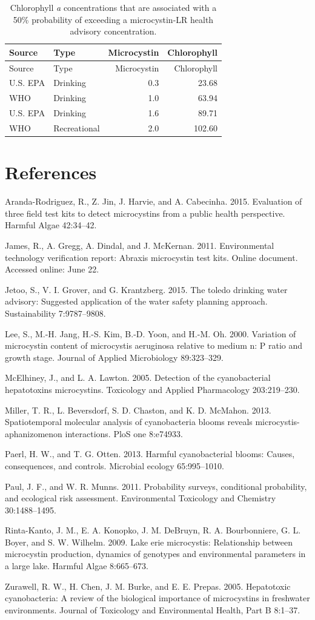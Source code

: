 \documentclass[11pt,]{article}
\begin{document}
\newpage

\begin{longtable}[c]{@{}llrr@{}}
\caption{Chlorophyll \textit{a} concentrations that are associated with
a 50\% probability of exceeding a microcystin-LR health advisory
concentration. \label{tab:mc_chla_table}}\tabularnewline
\toprule
Source & Type & Microcystin & Chlorophyll\tabularnewline
\midrule
\endfirsthead
\toprule
Source & Type & Microcystin & Chlorophyll\tabularnewline
\midrule
\endhead
U.S. EPA & Drinking & 0.3 & 23.68\tabularnewline
WHO & Drinking & 1.0 & 63.94\tabularnewline
U.S. EPA & Drinking & 1.6 & 89.71\tabularnewline
WHO & Recreational & 2.0 & 102.60\tabularnewline
\bottomrule
\end{longtable}

\newpage

\section*{References}\label{references}

Aranda-Rodriguez, R., Z. Jin, J. Harvie, and A. Cabecinha. 2015.
Evaluation of three field test kits to detect microcystins from a public
health perspective. Harmful Algae 42:34--42.

James, R., A. Gregg, A. Dindal, and J. McKernan. 2011. Environmental
technology verification report: Abraxis microcystin test kits. Online
document. Accessed online: June 22.

Jetoo, S., V. I. Grover, and G. Krantzberg. 2015. The toledo drinking
water advisory: Suggested application of the water safety planning
approach. Sustainability 7:9787--9808.

Lee, S., M.-H. Jang, H.-S. Kim, B.-D. Yoon, and H.-M. Oh. 2000.
Variation of microcystin content of microcystis aeruginosa relative to
medium n: P ratio and growth stage. Journal of Applied Microbiology
89:323--329.

McElhiney, J., and L. A. Lawton. 2005. Detection of the cyanobacterial
hepatotoxins microcystins. Toxicology and Applied Pharmacology
203:219--230.

Miller, T. R., L. Beversdorf, S. D. Chaston, and K. D. McMahon. 2013.
Spatiotemporal molecular analysis of cyanobacteria blooms reveals
microcystis-aphanizomenon interactions. PloS one 8:e74933.

Paerl, H. W., and T. G. Otten. 2013. Harmful cyanobacterial blooms:
Causes, consequences, and controls. Microbial ecology 65:995--1010.

Paul, J. F., and W. R. Munns. 2011. Probability surveys, conditional
probability, and ecological risk assessment. Environmental Toxicology
and Chemistry 30:1488--1495.

Rinta-Kanto, J. M., E. A. Konopko, J. M. DeBruyn, R. A. Bourbonniere, G.
L. Boyer, and S. W. Wilhelm. 2009. Lake erie microcystis: Relationship
between microcystin production, dynamics of genotypes and environmental
parameters in a large lake. Harmful Algae 8:665--673.

Zurawell, R. W., H. Chen, J. M. Burke, and E. E. Prepas. 2005.
Hepatotoxic cyanobacteria: A review of the biological importance of
microcystins in freshwater environments. Journal of Toxicology and
Environmental Health, Part B 8:1--37.
\end{document}

